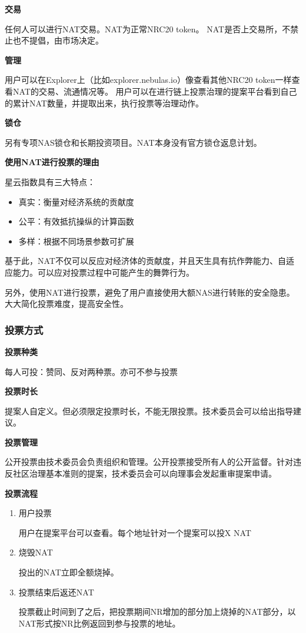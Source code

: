 \textbf{交易}

任何人可以进行NAT交易。NAT为正常NRC20 token。
NAT是否上交易所，不禁止也不提倡，由市场决定。

\textbf{管理}

用户可以在Explorer上（比如explorer.nebulas.io）像查看其他NRC20 token一样查看NAT的交易、流通情况等。
用户可以在进行链上投票治理的提案平台看到自己的累计NAT数量，并提取出来，执行投票等治理动作。

\textbf{锁仓}

另有专项NAS锁仓和长期投资项目。NAT本身没有官方锁仓返息计划。

\textbf{使用NAT进行投票的理由}

星云指数具有三大特点：
\begin{itemize}
	\item 真实：衡量对经济系统的贡献度
\item 公平：有效抵抗操纵的计算函数
\item 多样：根据不同场景参数可扩展
\end{itemize}
基于此，NAT不仅可以反应对经济体的贡献度，并且天生具有抗作弊能力、自适应能力。可以应对投票过程中可能产生的舞弊行为。

另外，使用NAT进行投票，避免了用户直接使用大额NAS进行转账的安全隐患。大大简化投票难度，提高安全性。

\subsubsection{投票方式}
\textbf{投票种类}

每人可投：赞同、反对两种票。亦可不参与投票

\textbf{投票时长}

提案人自定义。但必须限定投票时长，不能无限投票。技术委员会可以给出指导建议。

\textbf{投票管理}

公开投票由技术委员会负责组织和管理。公开投票接受所有人的公开监督。针对违反社区治理基本准则的提案，技术委员会可以向理事会发起重审提案申请。

\textbf{投票流程}
\begin{enumerate}

\item 用户投票

用户在提案平台可以查看。每个地址针对一个提案可以投X NAT

\item 烧毁NAT

投出的NAT立即全额烧掉。

\item 投票结束后返还NAT

投票截止时间到了之后，把投票期间NR增加的部分加上烧掉的NAT部分，以NAT形式按NR比例返回到参与投票的地址。
\end{enumerate}

